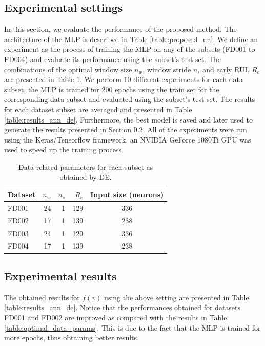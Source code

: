 \documentclass[preprint,12pt]{elsarticle}%
\begin{document}
\label{sec:rul_eval}

\subsection{Experimental settings}

In this section, we evaluate the performance of the proposed method. The architecture of the MLP is described in Table \ref{table:proposed_nn}. We define an experiment as the process of training the MLP on any of the subsets (FD001 to FD004) and evaluate its performance using the subset's test set. The combinations of the optimal window size $n_{w}$, window stride $n_{s}$ and early RUL $R_{e}$ are presented in Table \ref{table:data_params_de}. We perform $10$ different experiments for each data subset, the MLP is trained for 200 epochs using the train set for the corresponding data subset and evaluated using the subset's test set. The results for each dataset subset are averaged and presented in Table \ref{table:results_ann_de}. Furthermore, the best model is saved and later used to generate the results presented in Section \ref{sec:experimental_results}. All of the experiments were run using the Keras/Tensorflow framework, an NVIDIA GeForce 1080Ti GPU was used to speed up the training process.

\begin{table}[!htb]
\begin{center}
\begin{tabular}[c]{l r r r c}\hline
Dataset & $n_{w}$ & $n_{s}$ & $R_{e}$ & Input size (neurons) \\\hline
FD001 & 24 & 1 & 129 & 336\\
FD002 & 17 & 1 & 139 & 238\\
FD003 & 24 & 1 & 129 & 336\\
FD004 & 17 & 1 & 139 & 238\\\hline
\end{tabular}
\caption{Data-related parameters for each subset as obtained by DE.}
\label{table:data_params_de}
\end{center}
\end{table}

\subsection{Experimental results}
\label{sec:experimental_results}

The obtained results for $f(v)$ using the above setting are presented in Table \ref{table:results_ann_de}. Notice that the performances obtained for datasets FD001 and FD002 are improved as compared with the results in Table \ref{table:optimal_data_params}. This is due to the fact that the MLP is trained for more epochs, thus obtaining better results.
\end{document}
